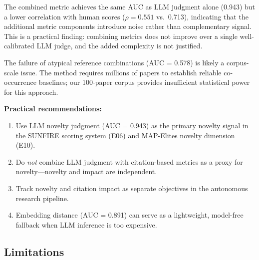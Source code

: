 \documentclass[11pt,a4paper]{article}
\begin{document}
The combined metric achieves the same AUC as LLM judgment alone (0.943)
but a lower correlation with human scores ($\rho = 0.551$ vs.\ 0.713),
indicating that the additional metric components introduce noise rather
than complementary signal.  This is a practical finding: combining
metrics does not improve over a single well-calibrated LLM judge, and
the added complexity is not justified.

The failure of atypical reference combinations (AUC = 0.578) is likely
a corpus-scale issue.  The \citet{uzzi2013atypical} method requires
millions of papers to establish reliable co-occurrence baselines; our
100-paper corpus provides insufficient statistical power for this
approach.

\textbf{Practical recommendations:}
\begin{enumerate}
  \item Use LLM novelty judgment (AUC = 0.943) as the primary novelty
        signal in the SUNFIRE scoring system (E06) and MAP-Elites
        novelty dimension (E10).
  \item Do \emph{not} combine LLM judgment with citation-based metrics
        as a proxy for novelty---novelty and impact are independent.
  \item Track novelty and citation impact as separate objectives in
        the autonomous research pipeline.
  \item Embedding distance (AUC = 0.891) can serve as a lightweight,
        model-free fallback when LLM inference is too expensive.
\end{enumerate}

\subsection{Limitations}
\end{document}
